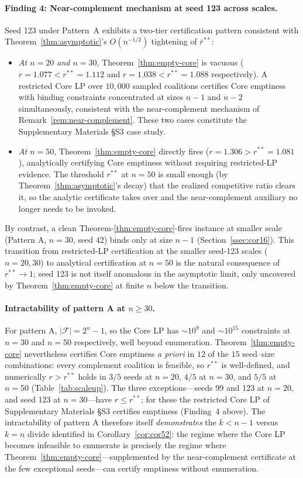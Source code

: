 \documentclass[11pt]{article}
\theoremstyle{plain}
\theoremstyle{definition}
\theoremstyle{remark}
\newcommand{\F}{\mathcal{F}}
\begin{document}
\paragraph{Finding 4: Near-complement mechanism at seed 123 across scales.} Seed 123 under Pattern~A exhibits a two-tier certification pattern consistent with Theorem~\ref{thm:asymptotic}'s $O(n^{-1/2})$ tightening of $\bar r^{\ast\ast}$:
\begin{itemize}
  \item \emph{At $n=20$ and $n=30$}, Theorem~\ref{thm:empty-core} is vacuous ($r=1.077<r^{\ast\ast}=1.112$ and $r=1.038<r^{\ast\ast}=1.088$ respectively). A restricted Core LP over $10{,}000$ sampled coalitions certifies Core emptiness with binding constraints concentrated at sizes $n-1$ and $n-2$ simultaneously, consistent with the near-complement mechanism of Remark~\ref{rem:near-complement}. These two cases constitute the Supplementary Materials \S S3 case study.
  \item \emph{At $n=50$}, Theorem~\ref{thm:empty-core} directly fires ($r=1.306>r^{\ast\ast}=1.081$), analytically certifying Core emptiness without requiring restricted-LP evidence. The threshold $r^{\ast\ast}$ at $n=50$ is small enough (by Theorem~\ref{thm:asymptotic}'s decay) that the realized competitive ratio clears it, so the analytic certificate takes over and the near-complement auxiliary no longer needs to be invoked.
\end{itemize}
By contrast, a clean Theorem-\ref{thm:empty-core}-fires instance at smaller scale (Pattern A, $n=30$, seed 42) binds only at size $n-1$ (Section~\ref{ssec:cor16}). This transition from restricted-LP certification at the smaller seed-123 scales ($n=20,30$) to analytical certification at $n=50$ is the natural consequence of $r^{\ast\ast}\to 1$; seed 123 is not itself anomalous in the asymptotic limit, only uncovered by Theorem~\ref{thm:empty-core} at finite $n$ below the transition.

\paragraph{Intractability of pattern A at $n\ge 30$.} For pattern A, $|\F| = 2^n-1$, so the Core LP has $\sim\!10^9$ and $\sim\!10^{15}$ constraints at $n=30$ and $n=50$ respectively, well beyond enumeration. Theorem~\ref{thm:empty-core} nevertheless certifies Core emptiness \emph{a priori} in $12$ of the $15$ seed--size combinations: every complement coalition is feasible, so $r^{\ast\ast}$ is well-defined, and numerically $r>r^{\ast\ast}$ holds in $3/5$ seeds at $n=20$, $4/5$ at $n=30$, and $5/5$ at $n=50$ (Table~\ref{tab:scaleup}). The three exceptions---seeds 99 and 123 at $n=20$, and seed 123 at $n=30$---have $r\le r^{\ast\ast}$; for these the restricted Core LP of Supplementary Materials \S S3 certifies emptiness (Finding~4 above). The intractability of pattern A therefore itself \emph{demonstrates} the $k<n-1$ versus $k=n$ divide identified in Corollary~\ref{cor:cor52}: the regime where the Core LP becomes infeasible to enumerate is precisely the regime where Theorem~\ref{thm:empty-core}---supplemented by the near-complement certificate at the few exceptional seeds---can certify emptiness without enumeration.
\end{document}
